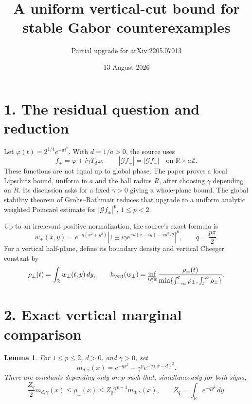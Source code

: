 \documentclass[11pt]{article}
\title{A uniform vertical-cut bound for stable Gabor counterexamples}
\author{Partial upgrade for arXiv:2205.07013}
\date{13 August 2026}
\newtheorem{lemma}{Lemma}
\newcommand{\R}{\mathbb R}
\begin{document}
\maketitle

\begin{center}
\end{center}

\section*{1. The residual question and reduction}

Let $\varphi(t)=2^{1/4}e^{-\pi t^2}$.  With $d=1/a>0$, the source uses
\[
 f_\pm=\varphi\pm i\gamma T_d\varphi,
 \qquad |\mathcal Gf_+|=|\mathcal Gf_-|
 \quad\text{on }\R\times a\mathbb Z.
\]
These functions are not equal up to global phase.  The paper proves a local
Lipschitz bound, uniform in $a$ and the ball radius $R$, after choosing
$\gamma$ depending on $R$.  Its discussion asks for a fixed $\gamma>0$ giving
a whole-plane bound.  The global stability theorem of Grohs--Rathmair reduces
that upgrade to a uniform analytic weighted Poincar\'e estimate for
$|\mathcal Gf_\pm|^p$, $1\le p<2$.

Up to an irrelevant positive normalization, the source's exact formula is
\begin{equation}\label{eq:weight}
 w_\pm(x,y)=e^{-q(x^2+y^2)}
 \left|1\pm i\gamma e^{\pi d(x-iy)-\pi d^2/2}\right|^p,
 \qquad q=\frac{p\pi}{2}.
\end{equation}
For a vertical half-plane, define its boundary density and vertical Cheeger
constant by
\[
 \rho_\pm(t)=\int_\R w_\pm(t,y)\,dy,
 \qquad
 h_{\rm vert}(w_\pm)=\inf_{t\in\R}
 \frac{\rho_\pm(t)}{
 \min\{\int_{-\infty}^t\rho_\pm,\int_t^\infty\rho_\pm\}}.
\]

\section*{2. Exact vertical marginal comparison}

\begin{lemma}\label{lem:marginal}
For $1\le p\le2$, $d>0$, and $\gamma>0$, set
\[
 m_{d,\gamma}(x)=e^{-qx^2}+\gamma^p e^{-q(x-d)^2}.
\]
There are constants depending only on $p$ such that, simultaneously for both
signs,
\[
 \frac{Z_q}{2}m_{d,\gamma}(x)
 \le \rho_\pm(x)\le Z_q2^{p-1}m_{d,\gamma}(x),
 \qquad Z_q=\int_\R e^{-qy^2}\,dy.
\]
\end{lemma}
\end{document}
